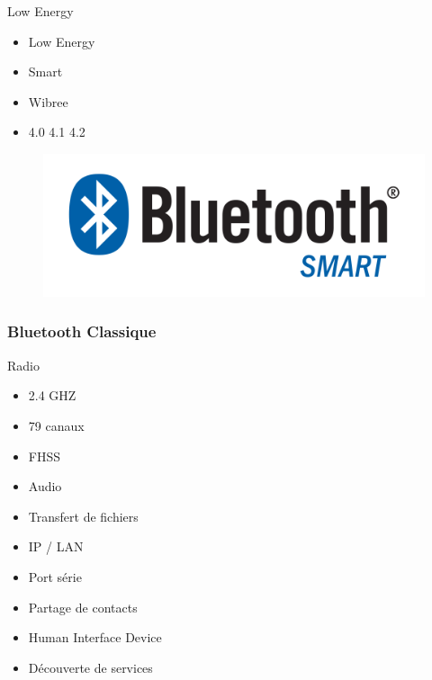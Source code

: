 \begin{frame}
\begin{minipage}[t]{0.30\linewidth}
		\begin{block}{Low Energy}
			\begin{itemize}
				\item Low Energy
				\item Smart
				\item Wibree
				\item 4.0 4.1 4.2
			\end{itemize}
		\end{block}
		\begin{figure}
			\includegraphics[width=\linewidth]{img/Bluetooth_Smart_Logo.png}
		\end{figure}
	\end{minipage}
\end{frame}

\begin{frame}[t]
	\frametitle{Bluetooth Classique}
	\begin{minipage}[t]{0.30\linewidth}
		\vspace{0.5cm}
		\begin{block}{Radio}
			\begin{itemize}
				\item 2.4 GHZ
				\item 79 canaux
				\item FHSS
			\end{itemize}
		\end{block}
	\end{minipage}
	\begin{minipage}[t]{0.66\linewidth}
		\vspace{0.5cm}
		\vspace{0.5cm}
		\begin{itemize}
			\item Audio
			\item Transfert de fichiers
			\item IP / LAN
			\item Port série
			\item Partage de contacts
			\item Human Interface Device
			\item Découverte de services
		\end{itemize}
	\end{minipage}
\end{frame}

